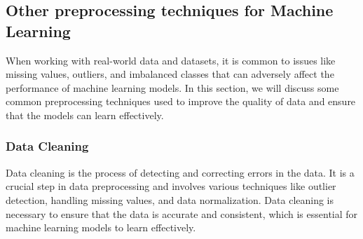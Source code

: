     \subsection{Other preprocessing techniques for Machine Learning}
    When working with real-world data and datasets, it is common to issues like missing values, outliers, and imbalanced classes that can adversely affect the performance of machine learning models. In this section, we will discuss some common preprocessing techniques used to improve the quality of data and ensure that the models can learn effectively.

    \subsubsection{Data Cleaning}
    Data cleaning is the process of detecting and correcting errors in the data. It is a crucial step in data preprocessing and involves various techniques like outlier detection, handling missing values, and data normalization. Data cleaning is necessary to ensure that the data is accurate and consistent, which is essential for machine learning models to learn effectively.

